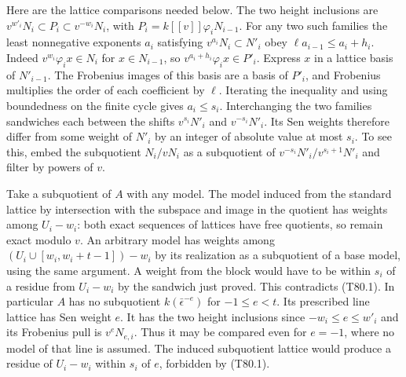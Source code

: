 Here are the lattice comparisons needed below. The two height inclusions
are $v^{w'_i}N_i\subset P_i\subset v^{-w_i}N_i$, with
$P_i=k[[v]]\varphi_i N_{i-1}$. For any two such families the least
nonnegative exponents $a_i$ satisfying $v^{a_i}N_i\subset N'_i$
obey $\ell a_{i-1}\le a_i+h_i$. Indeed $v^{w_i}\varphi_i x\in N_i$
for $x\in N_{i-1}$, so $v^{a_i+h_i}\varphi_i x\in P'_i$. Express
$x$ in a lattice basis of $N'_{i-1}$. The Frobenius images of this
basis are a basis of $P'_i$, and Frobenius multiplies the order of each
coefficient by $\ell$. Iterating the inequality and using boundedness
on the finite cycle gives $a_i\le s_i$. Interchanging the two families
sandwiches each between the shifts $v^{s_i}N'_i$ and $v^{-s_i}N'_i$.
Its Sen weights therefore differ from some weight of $N'_i$ by an
integer of absolute value at most $s_i$. To see this, embed the
subquotient $N_i/vN_i$ as a subquotient of
$v^{-s_i}N'_i/v^{s_i+1}N'_i$ and filter by powers of $v$.

Take a subquotient of $A$ with any model. The model induced from the
standard lattice by intersection with the subspace and image in the
quotient has weights among $U_i-w_i$: both exact sequences of lattices
have free quotients, so remain exact modulo $v$. An arbitrary model
has weights among $(U_i\cup[w_i,w_i+t-1])-w_i$ by its realization
as a subquotient of a base model, using the same argument. A weight
from the block would have to be within $s_i$ of a residue from
$U_i-w_i$ by the sandwich just proved. This contradicts (T80.1).
In particular $A$ has no subquotient $k(\bar\epsilon^{-e})$ for
$-1\le e<t$. Its prescribed line lattice has Sen weight $e$. It has the two
height inclusions since $-w_i\le e\le w'_i$ and its Frobenius pull
is $v^eN_{e,i}$. Thus it may be compared even for $e=-1$, where
no model of that line is assumed. The induced subquotient lattice would
produce a residue of $U_i-w_i$ within $s_i$ of $e$, forbidden by
(T80.1).

